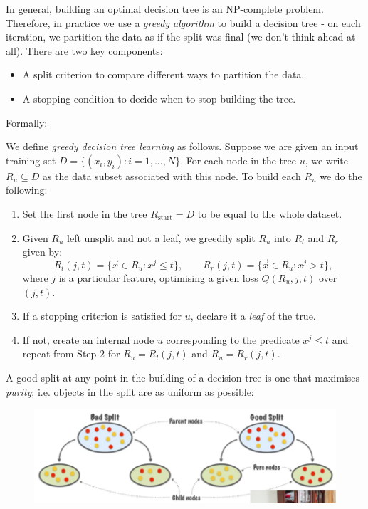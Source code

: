 In general, building an optimal decision tree is an NP-complete problem. Therefore, in practice we use a \textit{greedy algorithm} to build a decision tree - on each iteration, we partition the data as if the split was final (we don't think ahead at all). There are two key components:
\begin{itemize}
\item A split criterion to compare different ways to partition the data.
\item A stopping condition to decide when to stop building the tree.
\end{itemize}
Formally:
\begin{framedef}
We define \textit{greedy decision tree learning} as follows. Suppose we are given an input training set $D = \{(x_i,y_i) : i = 1,..., N\}$. For each node in the tree $u$, we write $R_u \subseteq D$ as the data subset associated with this node. To build each $R_u$ we do the following:
\begin{enumerate}[label = (\arabic*)]
\item Set the first node in the tree $R_{\text{start}} = D$ to be equal to the whole dataset.
\item Given $R_u$ left unsplit and not a leaf, we greedily split $R_u$ into $R_l$ and $R_r$ given by:
\begin{equation*}
R_l(j,t) = \{\vec{x} \in R_u : x^j \leq t\}, \qquad R_r(j,t) = \{\vec{x} \in R_u : x^j > t\},
\end{equation*}
where $j$ is a particular feature, optimising a given loss $Q(R_u,j,t)$ over $(j,t)$.
\item If a stopping criterion is satisfied for $u$, declare it a \textit{leaf} of the true.
\item If not, create an internal node $u$ corresponding to the predicate $x^j \leq t$ and repeat from Step 2 for $R_u = R_l(j,t)$ and $R_u = R_r(j,t)$. 
\end{enumerate}
\end{framedef}

\newpage
A good split at any point in the building of a decision tree is one that maximises \textit{purity}; i.e. objects in the split are as uniform as possible:

\begin{figure}[H]
\centering
\includegraphics[scale=0.3]{goodsplit.png}
\end{figure}

